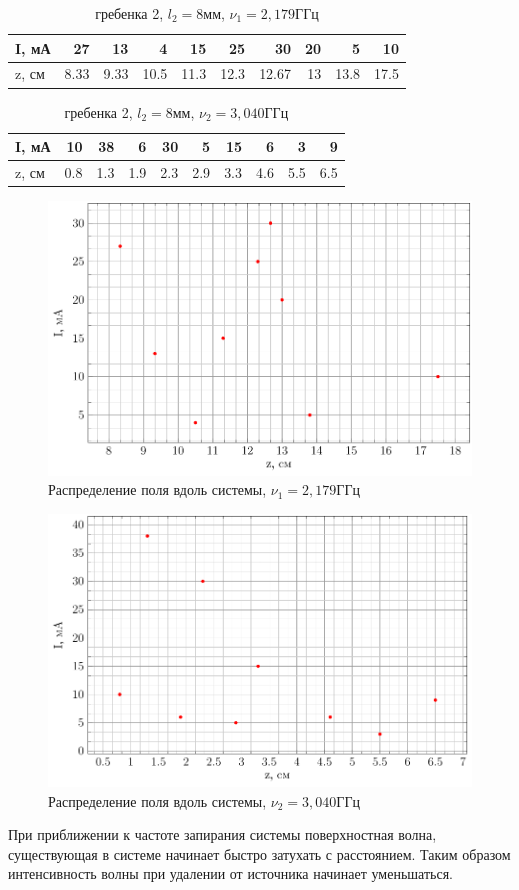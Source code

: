 \documentclass[a4paper,14pt]{extarticle}
\begin{document}
\begin{table}[htbp]
	\centering
	\caption{гребенка 2, $l_2=8\text{мм}$, $\nu_1=2,179 \text{ГГц}$}
	\begin{tabular}{|l|r|r|r|r|r|r|r|r|r|}
		\hline
		I, мА & 27    & 13    & 4     & 15    & 25    & 30    & 20    & 5     & 10 \\
		\hline
		z, см & 8.33  & 9.33  & 10.5  & 11.3  & 12.3  & 12.67 & 13    & 13.8  & 17.5 \\
		\hline
	\end{tabular}%
	\label{tab:addlabel}%
\end{table}%

\begin{table}[htbp]
	\centering
	\caption{гребенка 2, $l_2=8\text{мм}$, $\nu_2=3,040 \text{ГГц}$}
	\begin{tabular}{|l|r|r|r|r|r|r|r|r|r|}
		\hline
		I, мА & 10    & 38    & 6     & 30    & 5     & 15    & 6     & 3     & 9 \\
		\hline
		z, см & 0.8   & 1.3   & 1.9   & 2.3   & 2.9   & 3.3   & 4.6   & 5.5   & 6.5 \\
		\hline
	\end{tabular}%
	\label{tab:addlabel}%
\end{table}%
\begin{figure}[H]
	\centering
	\includegraphics[width=0.8\linewidth]{plots/task2_1}
	\caption{Распределение поля вдоль системы, $\nu_1=2,179 \text{ГГц}$}
	\label{task2_1}
	\end{figure}

\begin{figure}[H]
	\centering
	\includegraphics[width=0.8\linewidth]{plots/task2_2}
	\caption{Распределение поля вдоль системы, $\nu_2=3,040 \text{ГГц}$}
	\label{task2_2}
\end{figure}

При приближении к частоте запирания системы поверхностная волна, существующая в системе начинает быстро затухать с расстоянием. Таким образом интенсивность волны при удалении от источника начинает уменьшаться.
\end{document}
